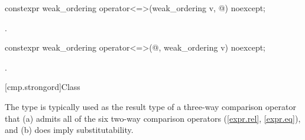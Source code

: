 %
\begin{itemdecl}
constexpr weak_ordering operator<=>(weak_ordering v, @\unspec@) noexcept;
\end{itemdecl}

\begin{itemdescr}
\pnum
\returns
{}.
\end{itemdescr}

%
\begin{itemdecl}
constexpr weak_ordering operator<=>(@\unspec@, weak_ordering v) noexcept;
\end{itemdecl}

\begin{itemdescr}
\pnum
\returns
{}.
\end{itemdescr}

[cmp.strongord]{Class }

\pnum
The  type is typically used
as the result type of a three-way comparison operator
that (a) admits all of the six two-way comparison operators (\ref{expr.rel}, \ref{expr.eq}),
and (b) does imply substitutability.

